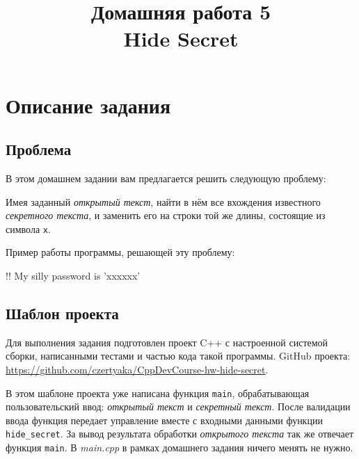 \documentclass[14pt]{extarticle}
\title{Домашняя работа 5 \\ Hide Secret}
\begin{document}
\maketitle

\tableofcontents

\section{Описание задания}

    \subsection{Проблема}
    
    В этом домашнем задании вам предлагается решить следующую проблему:

    \begin{tcolorbox}[title=Проблема]

        Имея заданный \textit{открытый текст}, найти в нём все вхождения известного
        \textit{секретного текста}, и заменить его на строки той же длины, состоящие
        из символа \texttt{x}.
        
    \end{tcolorbox}

    Пример работы программы, решающей эту проблему:

    \begin{terminalwindow}
!!
My silly password is 'xxxxxx'
    \end{terminalwindow}

    \subsection{Шаблон проекта}
    
        Для выполнения задания подготовлен проект C++ с настроенной системой сборки,
        написанными тестами и частью кода такой программы.
        GitHub проекта: \url{https://github.com/czertyaka/CppDevCourse-hw-hide-secret}.

        В этом шаблоне проекта уже написана функция \texttt{main}, обрабатывающая
        пользовательский ввод: \textit{открытый текст} и \textit{секретный текст}.
        После валидации ввода функция передает управление вместе с входными данными
        функции \texttt{hide\_secret}.
        За вывод результата обработки \textit{открытого текста} так же отвечает
        функция \texttt{main}.
        В \textit{main.cpp} в рамках домашнего задания ничего менять не нужно.
\end{document}

